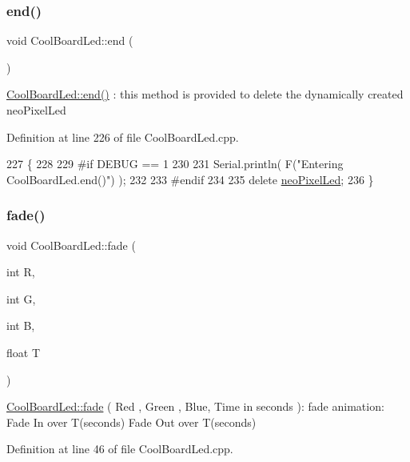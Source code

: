 \subsubsection{\texorpdfstring{end()}{end()}}
{\footnotesize\ttfamily void Cool\+Board\+Led\+::end (\begin{DoxyParamCaption}{ }\end{DoxyParamCaption})}

\hyperlink{class_cool_board_led_a69f323359e0c9f797422f2152b5d41ef}{Cool\+Board\+Led\+::end()} \+: this method is provided to delete the dynamically created neo\+Pixel\+Led 

Definition at line 226 of file Cool\+Board\+Led.\+cpp.


\begin{DoxyCode}
227 \{
228 
229 \textcolor{preprocessor}{#if DEBUG == 1 }
230     
231     Serial.println( F(\textcolor{stringliteral}{"Entering CoolBoardLed.end()"}) );
232 
233 \textcolor{preprocessor}{#endif}
234 
235     \textcolor{keyword}{delete} \hyperlink{class_cool_board_led_ac2c13fa462a010cd9242bf297c013923}{neoPixelLed};
236 \}
\end{DoxyCode}
\mbox{\label{class_cool_board_led_af1cacbaa88db8bcf6042c1083ba41155}} 
\subsubsection{\texorpdfstring{fade()}{fade()}}
{\footnotesize\ttfamily void Cool\+Board\+Led\+::fade (\begin{DoxyParamCaption}\item[{int}]{R,  }\item[{int}]{G,  }\item[{int}]{B,  }\item[{float}]{T }\end{DoxyParamCaption})}

\hyperlink{class_cool_board_led_af1cacbaa88db8bcf6042c1083ba41155}{Cool\+Board\+Led\+::fade} ( Red , Green , Blue, Time in seconds )\+: fade animation\+: Fade In over T(seconds) Fade Out over T(seconds) 

Definition at line 46 of file Cool\+Board\+Led.\+cpp.



